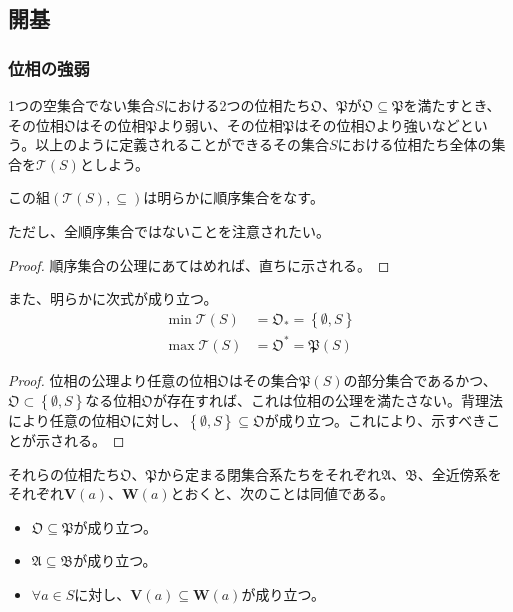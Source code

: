 \documentclass[dvipdfmx]{jsarticle}
\begin{document}
\subsection{開基}%
\subsubsection{位相の強弱}%
\begin{dfn}
1つの空集合でない集合$S$における2つの位相たち$\mathfrak{O}$、$\mathfrak{P}$が$\mathfrak{O \subseteq P}$を満たすとき、その位相$\mathfrak{O}$はその位相$\mathfrak{P}$より弱い、その位相$\mathfrak{P}$はその位相$\mathfrak{O}$より強いなどという。以上のように定義されることができるその集合$S$における位相たち全体の集合を$\mathcal{T}(S)$としよう。
\end{dfn}
\begin{thm}\label{8.1.2.1}
この組$\left( \mathcal{T}(S), \subseteq \right)$は明らかに順序集合をなす。
\end{thm}\par
ただし、全順序集合ではないことを注意されたい。
\begin{proof} 順序集合の公理にあてはめれば、直ちに示される。
\end{proof}
\begin{thm}\label{8.1.2.2} また、明らかに次式が成り立つ。
\begin{align*}
\min{\mathcal{T}(S)} &= \mathfrak{O}_{*} = \left\{ \emptyset,S \right\}\\
\max{\mathcal{T}(S)} &= \mathfrak{O}^{*} = \mathfrak{P}(S)
\end{align*}
\end{thm}
\begin{proof}
位相の公理より任意の位相$\mathfrak{O}$はその集合$\mathfrak{P}(S)$の部分集合であるかつ、$\mathfrak{O \subset}\left\{ \emptyset,S \right\}$なる位相$\mathfrak{O}$が存在すれば、これは位相の公理を満たさない。背理法により任意の位相$\mathfrak{O}$に対し、$\left\{ \emptyset,S \right\}\subseteq \mathfrak{O}$が成り立つ。これにより、示すべきことが示される。
\end{proof}
\begin{thm}\label{8.1.2.3}
それらの位相たち$\mathfrak{O}$、$\mathfrak{P}$から定まる閉集合系たちをそれぞれ$\mathfrak{A}$、$\mathfrak{B}$、全近傍系をそれぞれ$\mathbf{V}(a)$、$\mathbf{W}(a)$とおくと、次のことは同値である。
\begin{itemize}
\item
  $\mathfrak{O \subseteq P}$が成り立つ。
\item
  $\mathfrak{A \subseteq B}$が成り立つ。
\item
  $\forall a \in S$に対し、$\mathbf{V}(a) \subseteq \mathbf{W}(a)$が成り立つ。
\end{itemize}
\end{thm}
\end{document}
